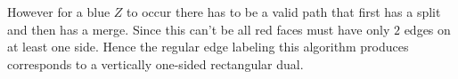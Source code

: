  However for a blue $Z$ to occur there has to be a valid path that first has a split and then has a merge. Since this can't be all red faces must have only $2$ edges on at least one side. Hence the regular edge labeling this algorithm produces corresponds to a vertically one-sided rectangular dual.


